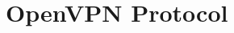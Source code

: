 \documentclass[11pt,oneside]{book}
\begin{document}
% 

\appendix
\chapter{OpenVPN Protocol}
\label{OpenVPN:protocol}





\printindex
{}

\begin{verbatim}










\end{verbatim}
\end{document}
